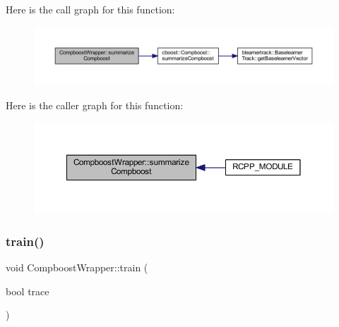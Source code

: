 Here is the call graph for this function\+:\nopagebreak
\begin{figure}[H]
\begin{center}
\leavevmode
\includegraphics[width=350pt]{class_compboost_wrapper_aa656658dec0c8396f4bea7c4049ed264_cgraph}
\end{center}
\end{figure}
Here is the caller graph for this function\+:\nopagebreak
\begin{figure}[H]
\begin{center}
\leavevmode
\includegraphics[width=350pt]{class_compboost_wrapper_aa656658dec0c8396f4bea7c4049ed264_icgraph}
\end{center}
\end{figure}
\mbox{\label{class_compboost_wrapper_a361e455353ee08273d41ed7b8350881d}} 
\subsubsection{\texorpdfstring{train()}{train()}}
{\footnotesize\ttfamily void Compboost\+Wrapper\+::train (\begin{DoxyParamCaption}\item[{bool}]{trace }\end{DoxyParamCaption})\hspace{0.3cm}{\ttfamily [inline]}}

